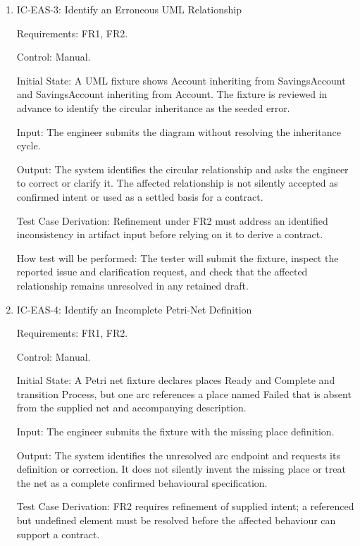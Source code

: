 \documentclass[12pt, titlepage]{article}
\begin{document}
\begin{enumerate}
How test will be performed: The tester will submit the fixture and compare the
extracted behaviour with the independently reviewed token-flow interpretation.

\item{IC-EAS-3: Identify an Erroneous UML Relationship\\}

Requirements: FR1, FR2.

Control: Manual.

Initial State: A UML fixture shows Account inheriting from SavingsAccount and
SavingsAccount inheriting from Account. The fixture is reviewed in advance to
identify the circular inheritance as the seeded error.

Input: The engineer submits the diagram without resolving the inheritance
cycle.

Output: The system identifies the circular relationship and asks the engineer
to correct or clarify it. The affected relationship is not silently accepted
as confirmed intent or used as a settled basis for a contract.

Test Case Derivation: Refinement under FR2 must address an identified
inconsistency in artifact input before relying on it to derive a contract.

How test will be performed: The tester will submit the fixture, inspect the
reported issue and clarification request, and check that the affected
relationship remains unresolved in any retained draft.

\item{IC-EAS-4: Identify an Incomplete Petri-Net Definition\\}

Requirements: FR1, FR2.

Control: Manual.

Initial State: A Petri net fixture declares places Ready and Complete and
transition Process, but one arc references a place named Failed that is absent
from the supplied net and accompanying description.

Input: The engineer submits the fixture with the missing place definition.

Output: The system identifies the unresolved arc endpoint and requests its
definition or correction. It does not silently invent the missing place or
treat the net as a complete confirmed behavioural specification.

Test Case Derivation: FR2 requires refinement of supplied intent; a referenced
but undefined element must be resolved before the affected behaviour can
support a contract.


\end{enumerate}
\end{document}
